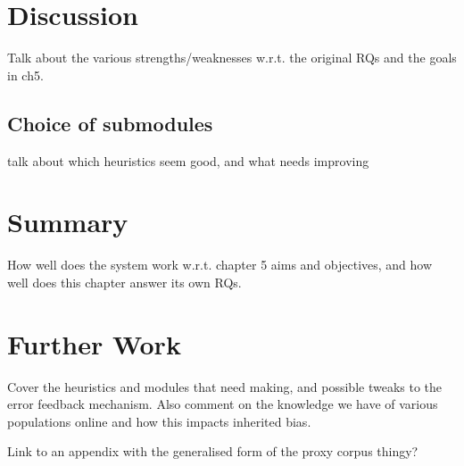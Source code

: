 \section{Discussion}
\label{sec:evaluation:discussion}
Talk about the various strengths/weaknesses w.r.t. the original RQs and the goals in ch5.
\subsection{Choice of submodules}
talk about which heuristics seem good, and what needs improving


\section{Summary}
How well does the system work w.r.t. chapter 5 aims and objectives, and how well does this chapter 
answer its own RQs.


\section{Further Work}
\label{sec:evaluation:furtherwork}
Cover the heuristics and modules that need making, and possible tweaks to the error feedback mechanism.  Also comment on the knowledge we have of various populations online and how this impacts inherited bias.

Link to an appendix with the generalised form of the proxy corpus thingy?
